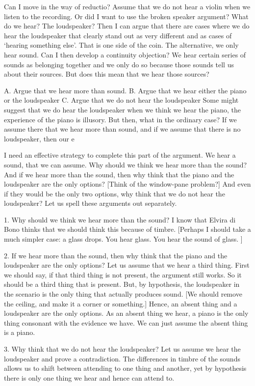 \documentclass[sloppy, journal, git, bytitle, dodraft]{humapap}
\begin{document}
Can I move in the way of reductio? Assume that we do not hear a violin when we listen to the recording. Or did I want to use the broken speaker argument? What do we hear? The loudspeaker? Then I can argue that there are cases where we do hear the loudspeaker that clearly stand out as very different and as cases of `hearing something else'. That is one side of the coin. The alternative, we only hear sound. Can I then develop a continuity objection? We hear certain series of sounds as belonging together and we only do so because those sounds tell us about their sources. But does this mean that we hear those sources? 

A. Argue that we hear more than sound.
B. Argue that we hear either the piano or the loudspeaker
C. Argue that we do not hear the loudspeaker
Some might suggest that we do hear the loudspeaker when we think we hear the piano, the experience of the piano is illusory. But then, what in the ordinary case? If we assume there that we hear more than sound, and if we assume that there is no loudspeaker, then our e

I need an effective strategy to complete this part of the argument. We hear a sound, that we can assume. Why should we think we hear more than the sound? And if we hear more than the sound, then why think that the piano and the loudspeaker are the only options? [Think of the window-pane problem?] And even if they would be the only two options, why think that we do not hear the loudspeaker? Let us spell these arguments out separately. 

1. Why should we think we hear more than the sound? I know that Elvira di Bono thinks that we should think this because of timbre. 
[Perhaps I should take a much simpler case: a glass drops. You hear glass. You hear the sound of glass. ]

2. If we hear more than the sound, then why think that the piano and the loudspeaker are the only options? Let us assume that we hear a third thing. First we should say, if that third thing is not present, the argument still works. So it should be a third thing that is present. But, by hypothesis, the loudspeaker in the scenario is the only thing that actually produces sound. [We should remove the ceiling, and make it a corner or something.] Hence, an absent thing and a loudspeaker are the only options. As an absent thing we hear, a piano is the only thing consonant with the evidence we have. We can just assume the absent thing is a piano. 

3. Why think that we do not hear the loudspeaker? Let us assume we hear the loudspeaker and prove a contradiction. The differences in timbre of the sounds allows us to shift between attending to one thing and another, yet by hypothesis there is only one thing we hear and hence can attend to. 
\end{document}
